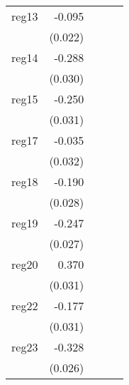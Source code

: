 {\begin{longtable}{l*{4}{D{.}{.}{-1}}}
\addlinespace
reg13       &      -0.095\sym{***}&                     &                     &                     \\
            &     (0.022)         &                     &                     &                     \\
\addlinespace
reg14       &      -0.288\sym{***}&                     &                     &                     \\
            &     (0.030)         &                     &                     &                     \\
\addlinespace
reg15       &      -0.250\sym{***}&                     &                     &                     \\
            &     (0.031)         &                     &                     &                     \\
\addlinespace
reg17       &      -0.035         &                     &                     &                     \\
            &     (0.032)         &                     &                     &                     \\
\addlinespace
reg18       &      -0.190\sym{***}&                     &                     &                     \\
            &     (0.028)         &                     &                     &                     \\
\addlinespace
reg19       &      -0.247\sym{***}&                     &                     &                     \\
            &     (0.027)         &                     &                     &                     \\
\addlinespace
reg20       &       0.370\sym{***}&                     &                     &                     \\
            &     (0.031)         &                     &                     &                     \\
\addlinespace
reg22       &      -0.177\sym{***}&                     &                     &                     \\
            &     (0.031)         &                     &                     &                     \\
\addlinespace
reg23       &      -0.328\sym{***}&                     &                     &                     \\
            &     (0.026)         &                     &                     &                     \\

\end{longtable}}
